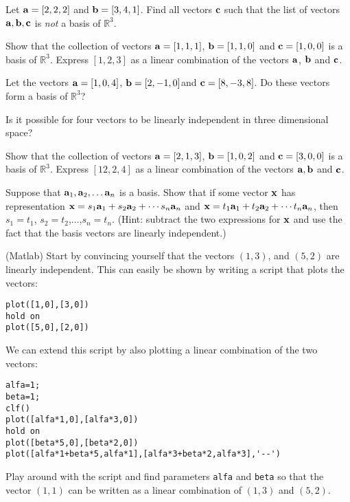 \begin{problem}
\label{2008_a3_2} Let $\aa = [2,2,2]$ and $\bb = [3,4,1]$. Find
all vectors $\cc$ such that the list of vectors $\aa, \bb, \cc$ is 
{\em not} a basis of $\mathbb{R}^3$. 
\end{problem}

\begin{problem}
\label{2008_a3_1} Show that the collection of vectors $\aa = [1,1,1]$,
$\bb =[1,1,0]$ and $\cc = [1,0,0]$ is a basis of $\mathbb{R}^3$. Express 
$[1,2,3]$ as a linear combination of the vectors $\aa$, $\bb$ and $\cc$. 
\end{problem}

\begin{problem}
\label{2009_a3_1}
Let  the vectors ${\bf a} = [1,0,4]$, ${\bf b} = [2,-1,0] $and ${\bf c} = [8,-3,8]$. Do these vectors form a basis of $\mathbb{R}^3$? 
\end{problem}

\begin{problem}
\label{op1_38}
Is it possible for four vectors to be linearly independent in
three dimensional space?
\end{problem}

\begin{problem}
\label{2009_a3_2}
Show that the collection of vectors ${\bf a} = [2,1,3]$, ${\bf b} = [1,0,2] $ and ${\bf c} = [3,0,0]$ is a basis of $\mathbb{R}^3$. Express $[12, 2,4]$ as a linear combination of the vectors ${\bf a}, {\bf b}$ and ${\bf c}$.
\end{problem}

\begin{problem}
\label{op1_39}
Suppose that $\aa_1, \aa_2, \ldots \aa_n$ is a basis. Show that if some vector
$\xx$ has  representation $\xx=s_1\aa_1 + s_2\aa_2 + \cdots s_n\aa_n$
and $\xx=t_1\aa_1 + t_2\aa_2 + \cdots t_n\aa_n$, then $s_1=t_1$,
$s_2=t_2$,$\ldots$,$s_n=t_n$. (Hint: subtract the two expressions for $\xx$ and
use the fact that the basis vectors are linearly independent.)
\end{problem}

\begin{problem}
\label{matlab_op1_39}
(Matlab) Start by convincing yourself that the vectors $(1,3)$, and $(5,2)$ are linearly independent. This can easily be shown by writing a script that plots the vectors:
\begin{verbatim}
plot([1,0],[3,0])
hold on
plot([5,0],[2,0])
\end{verbatim}
We can extend this script by also plotting a linear combination of the two vectors:
\begin{verbatim}
alfa=1;
beta=1;
clf()
plot([alfa*1,0],[alfa*3,0])
hold on
plot([beta*5,0],[beta*2,0])
plot([alfa*1+beta*5,alfa*1],[alfa*3+beta*2,alfa*3],'--')
\end{verbatim}
Play around with the script and find parameters {\tt alfa} and {\tt beta} so that the vector $(1,1)$ can be written as a linear combination of $(1,3)$ and $(5,2)$.

\end{problem}

